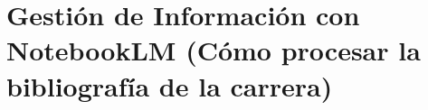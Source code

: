 
\section[Gestión de Información con NotebookLM]{Gestión de Información con NotebookLM (Cómo procesar la bibliografía de la carrera)}

